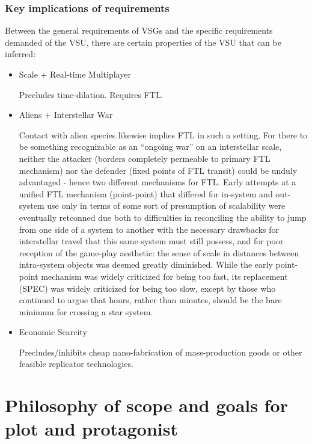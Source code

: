 \subsubsection{Key implications of requirements}

Between the general requirements of VSGs and the specific requirements
demanded of the VSU, there are certain properties of the VSU that can
be inferred:

\begin{itemize}

\item Scale + Real-time Multiplayer

Precludes time-dilation. Requires FTL.

\item Aliens + Interstellar War

Contact with alien species likewise implies FTL in such a setting. For there to be
something recognizable as an ``ongoing war'' on an interstellar
scale, neither the attacker (borders completely permeable to primary
FTL mechanism) nor the defender (fixed points of FTL transit) could be
unduly advantaged - hence two different mechanisms for FTL. Early
attempts at a unified FTL mechanism (point-point) that differed for
in-system and out-system use only in terms of some sort of presumption
of scalability were eventually retconned due both to difficulties in
reconciling the ability to jump from one side of a system to another
with the necessary drawbacks for interstellar travel that this same
system must still possess, and for poor reception of the game-play aesthetic: the sense of scale in distances between intra-system objects was deemed greatly diminished. While the early point-point mechanism was
widely criticized for being too fast, its replacement (SPEC) was
widely criticized for being too slow, except by those who continued to
argue that hours, rather than minutes, should be the bare minimum for
crossing a star system.


\item Economic Scarcity

Precludes/inhibits cheap nano-fabrication of mass-production goods or
other feasible replicator technologies.

\end{itemize}

\section{Philosophy of scope and goals for plot and protagonist}
\label{sec:plottingphilosophy}

